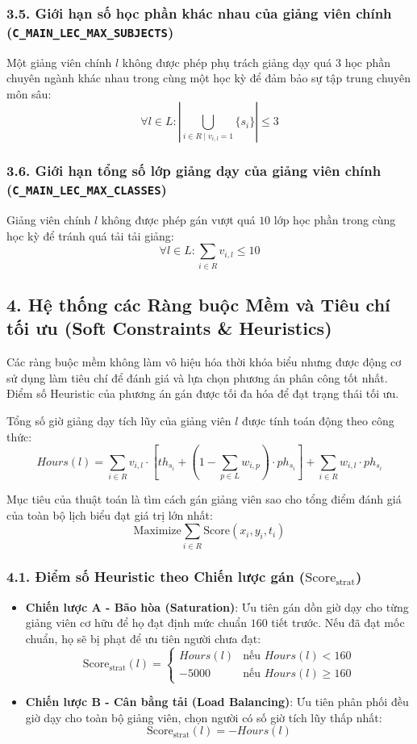 \documentclass{article}
\begin{document}
\subsubsection*{3.5. Giới hạn số học phần khác nhau của giảng viên chính (\texttt{C\_MAIN\_LEC\_MAX\_SUBJECTS})}
Một giảng viên chính $l$ không được phép phụ trách giảng dạy quá $3$ học phần chuyên ngành khác nhau trong cùng một học kỳ để đảm bảo sự tập trung chuyên môn sâu:
\[
\forall l \in L: \left| \bigcup_{i \in R \mid v_{i, l} = 1} \{s_i\} \right| \le 3
\]

\subsubsection*{3.6. Giới hạn tổng số lớp giảng dạy của giảng viên chính (\texttt{C\_MAIN\_LEC\_MAX\_CLASSES})}
Giảng viên chính $l$ không được phép gán vượt quá $10$ lớp học phần trong cùng học kỳ để tránh quá tải tải giảng:
\[
\forall l \in L: \sum_{i \in R} v_{i, l} \le 10
\]

\subsection*{4. Hệ thống các Ràng buộc Mềm và Tiêu chí tối ưu (Soft Constraints \& Heuristics)}

Các ràng buộc mềm không làm vô hiệu hóa thời khóa biểu nhưng được động cơ sử dụng làm tiêu chí để đánh giá và lựa chọn phương án phân công tốt nhất. Điểm số Heuristic của phương án gán được tối đa hóa để đạt trạng thái tối ưu.

Tổng số giờ giảng dạy tích lũy của giảng viên $l$ được tính toán động theo công thức:
\[
Hours(l) = \sum_{i \in R} v_{i, l} \cdot \left[ th_{s_i} + \left(1 - \sum_{p \in L} w_{i, p}\right) \cdot ph_{s_i} \right] + \sum_{i \in R} w_{i, l} \cdot ph_{s_i}
\]

Mục tiêu của thuật toán là tìm cách gán giảng viên sao cho tổng điểm đánh giá của toàn bộ lịch biểu đạt giá trị lớn nhất:
\[
\text{Maximize} \sum_{i \in R} \text{Score}(x_i, y_i, t_i)
\]

\subsubsection*{4.1. Điểm số Heuristic theo Chiến lược gán ($\text{Score}_{\text{strat}}$)}
\begin{itemize}
    \item \textbf{Chiến lược A - Bão hòa (Saturation)}: Ưu tiên gán dồn giờ dạy cho từng giảng viên cơ hữu để họ đạt định mức chuẩn $160$ tiết trước. Nếu đã đạt mốc chuẩn, họ sẽ bị phạt để ưu tiên người chưa đạt:
    \[
    \text{Score}_{\text{strat}}(l) = \begin{cases} Hours(l) & \text{nếu } Hours(l) < 160 \\ -5000 & \text{nếu } Hours(l) \ge 160 \end{cases}
    \]
    \item \textbf{Chiến lược B - Cân bằng tải (Load Balancing)}: Ưu tiên phân phối đều giờ dạy cho toàn bộ giảng viên, chọn người có số giờ tích lũy thấp nhất:
    \[
    \text{Score}_{\text{strat}}(l) = -Hours(l)
    \]
\end{itemize}
\end{document}
